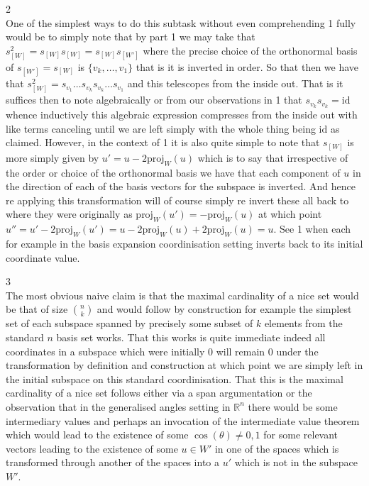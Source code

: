 2 \\
One of the simplest ways to do this subtask without even comprehending 1 fully would be to simply note that by part 1 we may take that $s_{[W]}^2 = s_{[W]} s_{[W]} = s_{[W]} s_{[W']}$ where the precise choice of the orthonormal basis of $s_{[W']} = s_{[W]}$ is $\{ v_k,\dots,v_1 \}$ that is it is inverted in order. So that then we have that $s_{[W]}^2 = s_{v_1} \dots s_{v_k} s_{v_k} \dots s_{v_1}$ and this telescopes from the inside out. That is it suffices then to note algebraically or from our observations in 1 that $s_{v_k} s_{v_k} = \text{id}$ whence inductively this algebraic expression compresses from the inside out with like terms canceling until we are left simply with the whole thing being $\text{id}$ as claimed. However, in the context of 1 it is also quite simple to note that $s_{[W]}$ is more simply given by $u' = u - 2 \text{proj}_W (u)$ which is to say that irrespective of the order or choice of the orthonormal basis we have that each component of $u$ in the direction of each of the basis vectors for the subspace is inverted. And hence re applying this transformation will of course simply re invert these all back to where they were originally as $\text{proj}_W (u') = - \text{proj}_W (u)$ at which point $u'' = u' - 2 \text{proj}_W (u') = u - 2 \text{proj}_W (u) + 2 \text{proj}_W (u) = u$. See 1 when each for example in the basis expansion coordinisation setting inverts back to its initial coordinate value.

3 \\
The most obvious naive claim is that the maximal cardinality of a nice set would be that of size $\binom{n}{k}$ and would follow by construction for example the simplest set of each subspace spanned by precisely some subset of $k$ elements from the standard $n$ basis set works. That this works is quite immediate indeed all coordinates in a subspace which were initially $0$ will remain $0$ under the transformation by definition and construction at which point we are simply left in the initial subspace on this standard coordinisation. That this is the maximal cardinality of a nice set follows either via a span argumentation or the observation that in the generalised angles setting in $\mathbb{R}^n$ there would be some intermediary values and perhaps an invocation of the intermediate value theorem which would lead to the existence of some $\cos(\theta) \neq 0,1$ for some relevant vectors leading to the existence of some $u \in W'$ in one of the spaces which is transformed through another of the spaces into a $u'$ which is not in the subspace $W'$.

